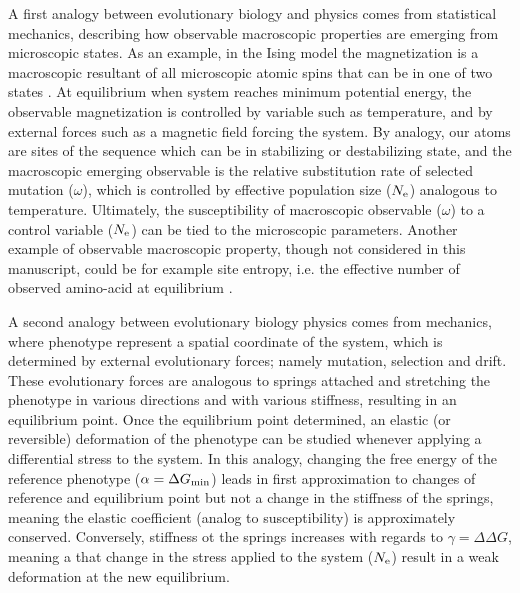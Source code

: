 \documentclass{MBE}%
\begin{document}
A first analogy between evolutionary biology and physics comes from statistical mechanics, describing how observable macroscopic properties are emerging from microscopic states.
As an example, in the Ising model the magnetization is a macroscopic resultant of all microscopic atomic spins that can be in one of two states \citep{Brush1967}.
At equilibrium when system reaches minimum potential energy, the observable magnetization is controlled by variable such as temperature, and by external forces such as a magnetic field forcing the system.
By analogy, our atoms are sites of the sequence which can be in stabilizing or destabilizing state, and the macroscopic emerging observable is the relative substitution rate of selected mutation ($\omega$), which is controlled by effective population size ($N_{\mathrm{e}}$) analogous to temperature.
Ultimately, the susceptibility of macroscopic observable ($\omega$) to a control variable ($N_{\mathrm{e}}$) can be tied to the microscopic parameters.
Another example of observable macroscopic property, though not considered in this manuscript, could be for example site entropy, i.e. the effective number of observed amino-acid at equilibrium \citep{Goldstein2016, Jimenez2018, Jiang2018}. 

A second analogy between evolutionary biology physics comes from mechanics, where phenotype represent a spatial coordinate of the system, which is determined by external evolutionary forces; namely mutation, selection and drift.
These evolutionary forces are analogous to springs attached and stretching the phenotype in various directions and with various stiffness, resulting in an equilibrium point.
Once the equilibrium point determined, an elastic (or reversible) deformation of the phenotype can be studied whenever applying a differential stress to the system.
In this analogy, changing the free energy of the reference phenotype ($\alpha = \Delta G_{\text{min}}$) leads in first approximation to changes of reference and equilibrium point but not a change in the stiffness of the springs, meaning the elastic coefficient (analog to susceptibility) is approximately conserved.
Conversely, stiffness ot the springs increases with regards to $\gamma = \Delta \Delta G$, meaning a that change in the stress applied to the system ($N_{\mathrm{e}}$) result in a weak deformation at the new equilibrium.
\end{document}
